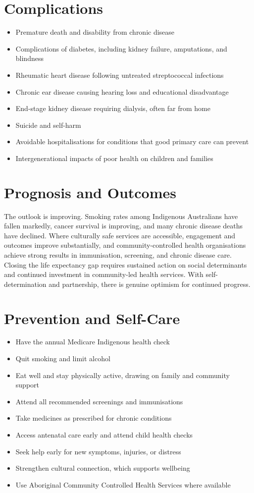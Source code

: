 \section*{Complications}
\begin{itemize}
    \item Premature death and disability from chronic disease
    \item Complications of diabetes, including kidney failure, amputations, and blindness
    \item Rheumatic heart disease following untreated streptococcal infections
    \item Chronic ear disease causing hearing loss and educational disadvantage
    \item End-stage kidney disease requiring dialysis, often far from home
    \item Suicide and self-harm
    \item Avoidable hospitalisations for conditions that good primary care can prevent
    \item Intergenerational impacts of poor health on children and families
\end{itemize}

\section*{Prognosis and Outcomes}
The outlook is improving. Smoking rates among Indigenous Australians have fallen markedly, cancer survival is improving, and many chronic disease deaths have declined. Where culturally safe services are accessible, engagement and outcomes improve substantially, and community-controlled health organisations achieve strong results in immunisation, screening, and chronic disease care. Closing the life expectancy gap requires sustained action on social determinants and continued investment in community-led health services. With self-determination and partnership, there is genuine optimism for continued progress.

\section*{Prevention and Self-Care}
\begin{itemize}
    \item Have the annual Medicare Indigenous health check
    \item Quit smoking and limit alcohol
    \item Eat well and stay physically active, drawing on family and community support
    \item Attend all recommended screenings and immunisations
    \item Take medicines as prescribed for chronic conditions
    \item Access antenatal care early and attend child health checks
    \item Seek help early for new symptoms, injuries, or distress
    \item Strengthen cultural connection, which supports wellbeing
    \item Use Aboriginal Community Controlled Health Services where available
\end{itemize}

